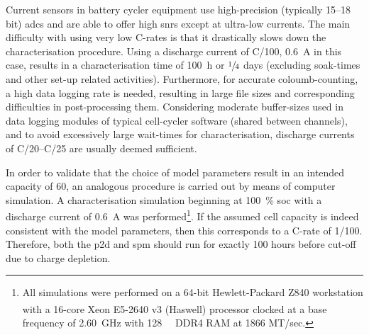 Current sensors in battery cycler equipment use high-precision (typically 15--18
bit) \glspl{adc}  and are  able to  offer high  \glspl{snr} except  at ultra-low
currents. The main difficulty with using very low C-rates is that it drastically
slows down the  characterisation procedure. Using a discharge  current of C/100,
\ie{}  \SI{0.6}{\ampere} in  this case,  results in  a characterisation  time of
\SI{100}{\hour} or  $\sfrac{1}{4}$ days (excluding soak-times  and other
set-up related  activities). Furthermore, for accurate  coloumb-counting, a high
data logging  rate is needed,  resulting in  large file sizes  and corresponding
difficulties in post-processing them.  Considering moderate buffer-sizes used in
data logging modules of typical  cell-cycler software (shared between channels),
and  to  avoid  excessively  large wait-times  for  characterisation,  discharge
currents of C/20--C/25 are usually deemed sufficient.

In order to validate  that the choice of model parameters  result in an intended
capacity  of  \SI{60}{\amphour},  an  analogous  procedure  is  carried  out  by
means  of  computer  simulation.  A  characterisation  simulation  beginning  at
\SI{100}{\percent} \gls{soc}  with a discharge current  of \SI{0.6}{\ampere} was
performed\footnote{All simulations  were performed  on a  64-bit Hewlett-Packard
Z840  workstation with  a 16-core  \textsuperscript{\textregistered}
Xeon\textsuperscript{\textregistered} E5-2640 v3  (Haswell) processor clocked at
a base frequency of \SI{2.60}{\giga\hertz} with \SI{128}{\giga\byte} DDR4 RAM at
1866 MT/sec.}. If the assumed cell  capacity is indeed consistent with the model
parameters, then  this corresponds  to a  C-rate of  1/100. Therefore,  both the
\gls{p2d} and \gls{spm}  should run for exactly 100 hours  before cut-off due to
charge depletion.



